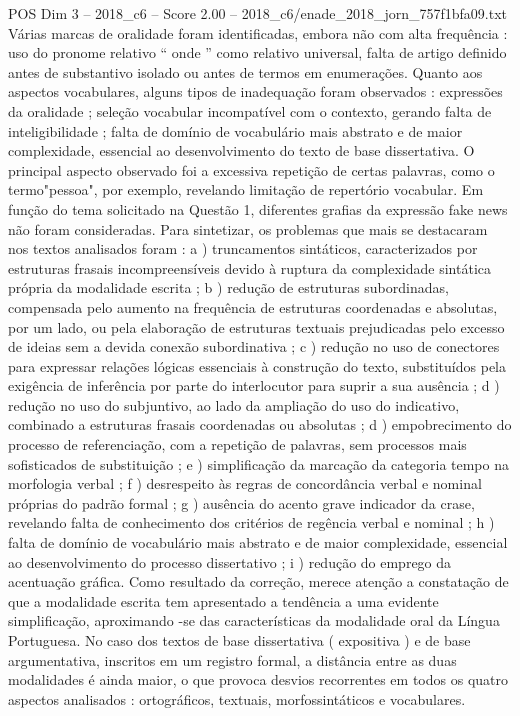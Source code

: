 \begin{textsample}{POS Dim 3 – 2018\_c6 – Score 2.00 – 2018\_c6/enade\_2018\_jorn\_757f1bfa09.txt}
Várias marcas de oralidade foram identificadas, embora não com alta frequência : uso do pronome relativo “ onde ” como relativo universal, falta de artigo definido antes de substantivo isolado ou antes de termos em enumerações.
Quanto aos aspectos vocabulares, alguns tipos de inadequação foram observados : expressões da oralidade ; seleção vocabular incompatível com o contexto, gerando falta de inteligibilidade ; falta de domínio de vocabulário mais abstrato e de maior complexidade, essencial ao desenvolvimento do texto de base dissertativa.
O principal aspecto observado foi a excessiva repetição de certas palavras, como o termo"pessoa", por exemplo, revelando limitação de repertório vocabular.
Em função do tema solicitado na Questão 1, diferentes grafias da expressão fake news não foram consideradas.
Para sintetizar, os problemas que mais se destacaram nos textos analisados foram : a ) truncamentos sintáticos, caracterizados por estruturas frasais incompreensíveis devido à ruptura da complexidade sintática própria da modalidade escrita ; b ) redução de estruturas subordinadas, compensada pelo aumento na frequência de estruturas coordenadas e absolutas, por um lado, ou pela elaboração de estruturas textuais prejudicadas pelo excesso de ideias sem a devida conexão subordinativa ; c ) redução no uso de conectores para expressar relações lógicas essenciais à construção do texto, substituídos pela exigência de inferência por parte do interlocutor para suprir a sua ausência ; d ) redução no uso do subjuntivo, ao lado da ampliação do uso do indicativo, combinado a estruturas frasais coordenadas ou absolutas ; d ) empobrecimento do processo de referenciação, com a repetição de palavras, sem processos mais sofisticados de substituição ; e ) simplificação da marcação da categoria tempo na morfologia verbal ; f ) desrespeito às regras de concordância verbal e nominal próprias do padrão formal ; g ) ausência do acento grave indicador da crase, revelando falta de conhecimento dos critérios de regência verbal e nominal ; h ) falta de domínio de vocabulário mais abstrato e de maior complexidade, essencial ao desenvolvimento do processo dissertativo ; i ) redução do emprego da acentuação gráfica.
Como resultado da correção, merece atenção a constatação de que a modalidade escrita tem apresentado a tendência a uma evidente simplificação, aproximando -se das características da modalidade oral da Língua Portuguesa.
No caso dos textos de base dissertativa ( expositiva ) e de base argumentativa, inscritos em um registro formal, a distância entre as duas modalidades é ainda maior, o que provoca desvios recorrentes em todos os quatro aspectos analisados : ortográficos, textuais, morfossintáticos e vocabulares.

\end{textsample}
